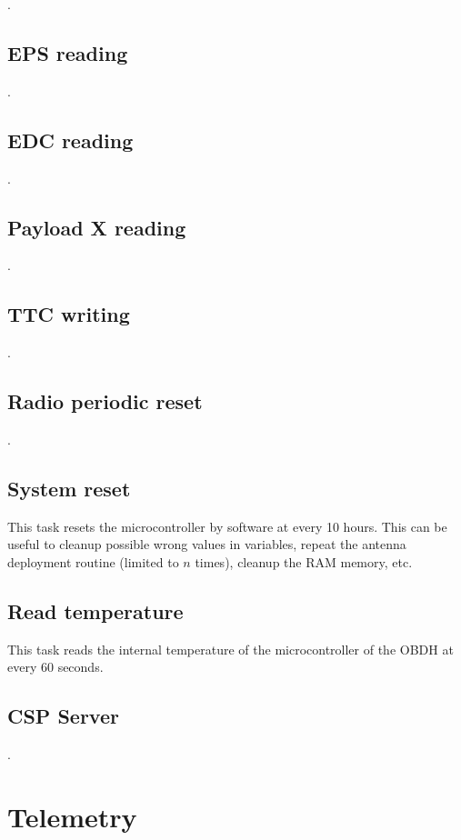 .

\subsection{EPS reading}

.

\subsection{EDC reading}

.

\subsection{Payload X reading}

.

\subsection{TTC writing}

.

\subsection{Radio periodic reset}

.

\subsection{System reset}

This task resets the microcontroller by software at every 10 hours. This can be useful to cleanup possible wrong values in variables, repeat the antenna deployment routine (limited to $n$ times), cleanup the RAM memory, etc.

\subsection{Read temperature}

This task reads the internal temperature of the microcontroller of the OBDH at every 60 seconds.

\subsection{CSP Server}

.

\section{Telemetry}


